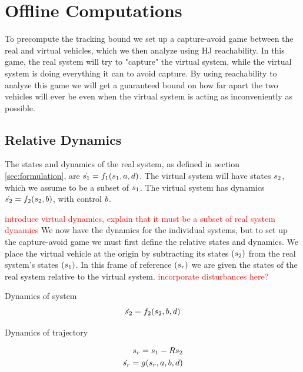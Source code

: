 \section{Offline Computations \label{sec:precomp}}

To precompute the tracking bound we set up a capture-avoid game between the real and virtual vehicles, which we then analyze using HJ reachability. In this game, the real system will try to "capture" the virtual system, while the virtual system is doing everything it can to avoid capture. By using reachability to analyze this game we will get a guaranteed bound on how far apart the two vehicles will ever be even when the virtual system is acting as inconveniently as possible.

\subsection{Relative Dynamics}
The states and dynamics of the real system, as defined in section \ref{sec:formulation}, are $\dot{s_1} = f_1(s_1, a, d)$. The virtual system will have states $s_2$, which we assume to be a subset of $s_1$. The virtual system has dynamics $\dot{s_2} = f_2(s_2, b)$, with control $b$.

\textcolor{red}{introduce virtual dynamics, explain that it must be a subset of real system dynamics}
We now have the dynamics for the individual systems, but to set up the capture-avoid game we must first define the relative states and dynamics. We place the virtual vehicle at the origin by subtracting its states $(s_2)$ from the real system's states $(s_1)$. In this frame of reference $(s_r)$ we are given the states of the real system relative to the virtual system. \textcolor{red}{incorporate disturbances here?}



Dynamics of system
\begin{equation}
\dot{s_2} = f_2(s_2, b, d)
\end{equation}

Dynamics of trajectory

\begin{equation}
\begin{aligned}
s_r = s_1 - Rs_2\\
\dot{s_r} = g(s_r, a, b, d)
\end{aligned}
\end{equation}

